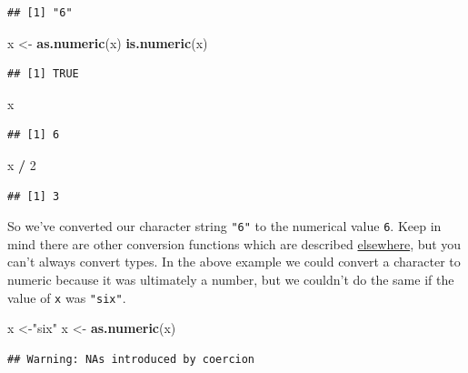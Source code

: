 \documentclass[
]{book}
\newenvironment{Shaded}{\begin{snugshade}}{\end{snugshade}}
\newcommand{\DecValTok}[1]{\textcolor[rgb]{0.00,0.00,0.81}{#1}}
\newcommand{\FunctionTok}[1]{\textcolor[rgb]{0.13,0.29,0.53}{\textbf{#1}}}
\newcommand{\NormalTok}[1]{#1}
\newcommand{\OtherTok}[1]{\textcolor[rgb]{0.56,0.35,0.01}{#1}}
\newcommand{\SpecialCharTok}[1]{\textcolor[rgb]{0.81,0.36,0.00}{\textbf{#1}}}
\newcommand{\StringTok}[1]{\textcolor[rgb]{0.31,0.60,0.02}{#1}}
\begin{document}
\begin{verbatim}
## [1] "6"
\end{verbatim}

\begin{Shaded}
\begin{Highlighting}[]
\NormalTok{x }\OtherTok{\textless{}{-}} \FunctionTok{as.numeric}\NormalTok{(x)}
\FunctionTok{is.numeric}\NormalTok{(x)}
\end{Highlighting}
\end{Shaded}

\begin{verbatim}
## [1] TRUE
\end{verbatim}

\begin{Shaded}
\begin{Highlighting}[]
\NormalTok{x}
\end{Highlighting}
\end{Shaded}

\begin{verbatim}
## [1] 6
\end{verbatim}

\begin{Shaded}
\begin{Highlighting}[]
\NormalTok{x }\SpecialCharTok{/} \DecValTok{2}
\end{Highlighting}
\end{Shaded}

\begin{verbatim}
## [1] 3
\end{verbatim}

So we've converted our character string \texttt{"6"} to the numerical value \texttt{6}. Keep in mind there are other conversion functions which are described \href{https://www.geeksforgeeks.org/conversion-functions-in-r-programming/}{elsewhere}, but you can't always convert types. In the above example we could convert a character to numeric because it was ultimately a number, but we couldn't do the same if the value of \texttt{x} was \texttt{"six"}.

\begin{Shaded}
\begin{Highlighting}[]
\NormalTok{x }\OtherTok{\textless{}{-}}\StringTok{"six"}
\NormalTok{x }\OtherTok{\textless{}{-}} \FunctionTok{as.numeric}\NormalTok{(x)}
\end{Highlighting}
\end{Shaded}

\begin{verbatim}
## Warning: NAs introduced by coercion
\end{verbatim}
\end{document}
